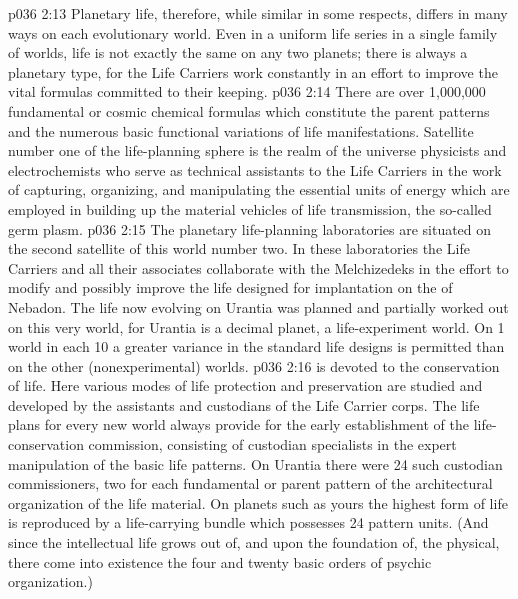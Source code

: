 \vs p036 2:13 Planetary life, therefore, while similar in some respects, differs in many ways on each evolutionary world. Even in a uniform life series in a single family of worlds, life is not exactly the same on any two planets; there is always a planetary type, for the Life Carriers work constantly in an effort to improve the vital formulas committed to their keeping.
\vs p036 2:14 There are over 1,000,000 fundamental or cosmic chemical formulas which constitute the parent patterns and the numerous basic functional variations of life manifestations. Satellite number one of the life\hyp{}planning sphere is the realm of the universe physicists and electrochemists who serve as technical assistants to the Life Carriers in the work of capturing, organizing, and manipulating the essential units of energy which are employed in building up the material vehicles of life transmission, the so\hyp{}called germ plasm.
\vs p036 2:15 The planetary life\hyp{}planning laboratories are situated on the second satellite of this world number two. In these laboratories the Life Carriers and all their associates collaborate with the Melchizedeks in the effort to modify and possibly improve the life designed for implantation on the  of Nebadon. The life now evolving on Urantia was planned and partially worked out on this very world, for Urantia is a decimal planet, a life\hyp{}experiment world. On 1 world in each 10 a greater variance in the standard life designs is permitted than on the other (nonexperimental) worlds.
\vs p036 2:16 \pc {} is devoted to the conservation of life. Here various modes of life protection and preservation are studied and developed by the assistants and custodians of the Life Carrier corps. The life plans for every new world always provide for the early establishment of the life\hyp{}conservation commission, consisting of custodian specialists in the expert manipulation of the basic life patterns. On Urantia there were 24 such custodian commissioners, two for each fundamental or parent pattern of the architectural organization of the life material. On planets such as yours the highest form of life is reproduced by a life\hyp{}carrying bundle which possesses 24 pattern units. (And since the intellectual life grows out of, and upon the foundation of, the physical, there come into existence the four and twenty basic orders of psychic organization.)
